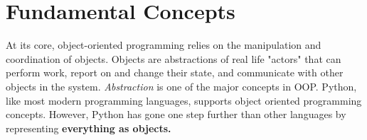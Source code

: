 \section*{Fundamental Concepts}

\begin{comment}
At its core, object oriented programming relies on the manipulation and coordination of objects.
An object represents a piece of code that tracks a state and provides methods for discovering or altering the state.


There are a few concepts that define object oriented programming

\begin{itemize}

\item Abstraction - appropriate representation of states and data

\item Encapsulation - independent behavior

\item Inheritance - relations between objects

\end{itemize}

The general advantage of using these concepts is that it helps with organizing code.
``Abstraction" permits the presentation of only necessary details about an object to the user.
For example, when we ask someone if they own a computer, we can use abstraction to ask the question ``Do you own a computer?'' rather than asking about each and every combination of hardware that we could classify as a computer.
Inheritance helps us easily achieve this abstraction.
We could have an object called \li{Computer}.
Various brands would then subclass, or inherit, the properties of \li{Computer}.
We could continue by having each product line inherit from their respective brands, until we arrive at the product level.
Then each individual product would represent an instantiation of that product's class.
Encapsulation means each function contains all of the data it needs to calculate a result.
Encapsulation is used to avoid the use of global data structures and makes managing data involved in computation more convenient.
\end{comment}

At its core, object-oriented programming relies on the manipulation and coordination of objects.
Objects are abstractions of real life "actors" that can perform work, report on and change their state, and communicate with other objects in the system. %
\emph{Abstraction} is one of the major concepts in OOP.
Python, like most modern programming languages, supports object oriented programming concepts.
However, Python has gone one step further than other languages by representing \textbf{everything as objects.}

